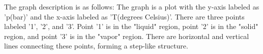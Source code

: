 The graph description is as follows: The graph is a plot with the y-axis labeled as 'p(bar)' and the x-axis labeled as 'T(degrees Celsius)'. There are three points labeled '1', '2', and '3'. Point '1' is in the "liquid" region, point '2' is in the "solid" region, and point '3' is in the "vapor" region. There are horizontal and vertical lines connecting these points, forming a step-like structure.